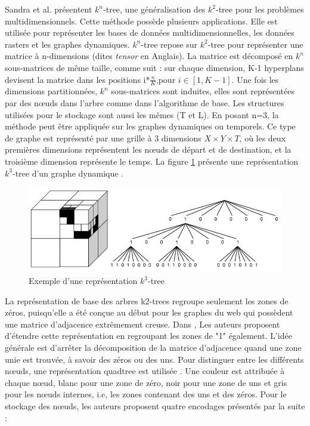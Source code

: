  Sandra et al. \citep{de2013compact} présentent $k^n$-tree, une généralisation des $k^2$-tree pour les problèmes multidimensionnels. Cette méthode possède plusieurs applications. Elle est utilisée pour représenter les bases de données multidimensionnelles, les données rasters et les graphes dynamiques. $k^n$-tree repose sur $k^2$-tree pour représenter une matrice à n-dimensions (dites \textit{tensor} en Anglais). La matrice est décomposé en $k^n$ sous-matrices de même taille, comme suit : sur chaque dimension, K-1 hyperplans devisent la matrice dans les positions i*$\frac{n}{K}$,pour $i \in [1, K-1]$. Une fois les dimensions partitionnées, $k^n$ sous-matrices sont induites, elles sont représentées par des nœuds dans l'arbre comme dans l'algorithme de base. Les structures utilisées pour le stockage sont aussi les mêmes (T et L).
En posant n=3, la méthode peut être appliquée sur les graphes dynamiques ou temporels. Ce type de graphe est représenté par une grille à 3 dimensions $X \times Y \times T$, où les deux premières dimensions représentent les nœuds de départ et de destination, et la troisième dimension représente le temps. 
La figure \ref{kn-trees} présente une représentation $k^3$-tree d'un graphe dynamique \citep{de2014new}.

\begin{figure}[H]
\begin{center}
\includegraphics[height=100 pt, width=380 pt]{./ressources/image/kn-trees.png} 
\end{center}
\caption{Exemple d'une représentation $k^3$-tree}
\label{kn-trees}
\end{figure}



La représentation de base des arbres k2-trees regroupe seulement les zones de zéros, puisqu'elle a été conçue au début pour les graphes du web qui possèdent une matrice d'adjacence extrêmement creuse. Dans \citep{de2014new}, Les auteurs proposent d'étendre cette représentation en regroupant les zones de "1" également. L'idée générale est d'arrêter la décomposition de la matrice d'adjacence quand une zone unie est trouvée, à savoir des zéros ou des uns. Pour distinguer entre les différents nœuds, une représentation quadtree est utilisée \citep{de1997computational}. Une couleur est attribuée à chaque nœud, blanc pour une zone de zéro, noir pour une zone de uns et gris pour les nœuds internes, i.e, les zones contenant des uns et des zéros. Pour le stockage des nœuds, les auteurs proposent quatre encodages présentés par la suite : 

